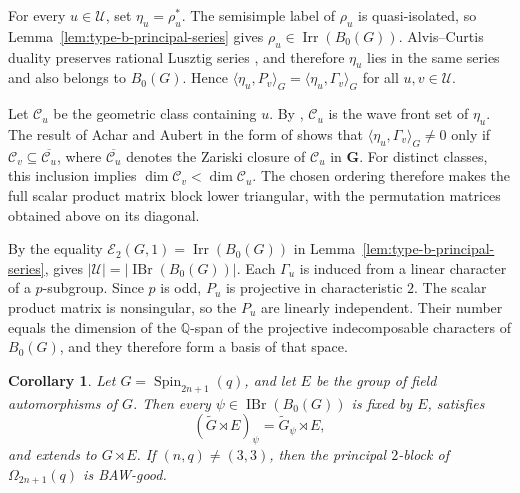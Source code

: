 \documentclass[10pt]{amsart}
\newtheorem{corollary}[theorem]{Corollary}
\theoremstyle{definition}
\let\oldendproof\endproof
\renewenvironment{proof}[1][\proofname]{%
  \oldproof[\bfseries #1]%
}{\oldendproof}
\DeclareMathOperator{\IBr}{IBr}
\DeclareMathOperator{\Irr}{Irr}
\numberwithin{equation}{section}
\numberwithin{table}{section}
\begin{document}
\begin{proof}
For every $u\in\mathcal U$, set $\eta_u=\rho_u^*$.
The semisimple label of $\rho_u$ is quasi-isolated, so
Lemma~\ref{lem:type-b-principal-series} gives
$\rho_u\in\Irr(B_0(G))$.
Alvis--Curtis duality preserves rational Lusztig series
\cite[Proposition~9.8(iv)]{CabanesEnguehard2004}, and therefore
$\eta_u$ lies in the same series and also belongs to $B_0(G)$. Hence
$\langle\eta_u,P_v\rangle_G=\langle\eta_u,\Gamma_v\rangle_G$ for all
$u,v\in\mathcal U$.

Let $\mathcal C_u$ be the geometric class containing $u$.
By \cite[Lemma~14.15]{Taylor2016}, $\mathcal C_u$ is the wave front
set of $\eta_u$. The result of Achar and Aubert in the form of
\cite[Proposition~15.2]{Taylor2016} shows that
$\langle\eta_u,\Gamma_v\rangle_G\neq0$ only if
$\mathcal C_v\subseteq\overline{\mathcal C_u}$, where $\overline{\mathcal
C_u}$ denotes the Zariski closure of $\mathcal C_u$ in $\mathbf G$. For
distinct classes, this inclusion implies $\dim\mathcal C_v<\dim\mathcal C_u$.
The chosen ordering therefore makes the full scalar product matrix block lower
triangular, with the permutation matrices obtained above on its diagonal.

By the equality $\mathcal E_2(G,1)=\Irr(B_0(G))$ in
Lemma~\ref{lem:type-b-principal-series},
\cite[Proposition~2.7]{Chaneb2021} gives
$|\mathcal U|=|\IBr(B_0(G))|$.
Each $\Gamma_u$ is induced from a linear character of a $p$-subgroup.
Since $p$ is odd, $P_u$ is projective in characteristic $2$.
The scalar product matrix is nonsingular, so the $P_u$ are linearly
independent. Their number equals the dimension of the $\mathbb Q$-span
of the projective indecomposable characters of $B_0(G)$, and they
therefore form a basis of that space.
\end{proof}

\begin{corollary}\label{cor:type-b-principal-selector}
Let $G=\operatorname{Spin}_{2n+1}(q)$, and let $E$ be the group of field
automorphisms of $G$. Then every $\psi\in\IBr(B_0(G))$ is fixed by $E$, satisfies
\[
 (\widetilde G\rtimes E)_\psi=\widetilde G_\psi\rtimes E,
\]
and extends to $G\rtimes E$. If $(n,q)\neq(3,3)$, then the principal
$2$-block of $\Omega_{2n+1}(q)$ is BAW-good.
\end{corollary}
\end{document}
